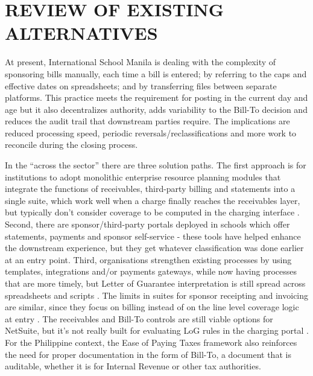 \section{REVIEW OF EXISTING ALTERNATIVES}

At present, International School Manila is dealing with the complexity of sponsoring bills manually, each time a bill is entered; by referring to the caps and effective dates on spreadsheets; and by transferring files between separate platforms. This practice meets the requirement for posting in the current day and age but it also decentralizes authority, adds variability to the Bill-To decision and reduces the audit trail that downstream parties require. The implications are reduced processing speed, periodic reversals/reclassifications and more work to reconcile during the closing process.

In the “across the sector” there are three solution paths. The first approach is for institutions to adopt monolithic enterprise resource planning modules that integrate the functions of receivables, third-party billing and statements into a single suite, which work well when a charge finally reaches the receivables layer, but typically don't consider coverage to be computed in the charging interface \citep{EllucianBannerARGuide2025,PeopleSoftSFThirdParty,BannerARWorkbook}. Second, there are sponsor/third-party portals deployed in schools which offer statements, payments and sponsor self-service \citep{TouchNetSponsorPoint,NelnetSponsorBilling,UTKSponsorPoint,SponsorPaymentsPortal} - these tools have helped enhance the downstream experience, but they get whatever classification was done earlier at an entry point. Third, organisations strengthen existing processes by using templates, integrations and/or payments gateways, while now having processes that are more timely, but Letter of Guarantee interpretation is still spread across spreadsheets and scripts \citep{PayMyTuitionSponsored,PayMyTuitionNewswire}. The limits in suites for sponsor receipting and invoicing are similar, since they focus on billing instead of on the line level coverage logic at entry \citep{TribalEbsSponsor,TribalEbsManagePayments}. The receivables and Bill-To controls are still viable options for NetSuite, but it's not really built for evaluating LoG rules in the charging portal \citep{NetSuiteThirdParty}. For the Philippine context, the Ease of Paying Taxes framework also reinforces the need for proper documentation \citep{BIR_EOPT} in the form of Bill-To, a document that is auditable, whether it is for Internal Revenue or other tax authorities.

